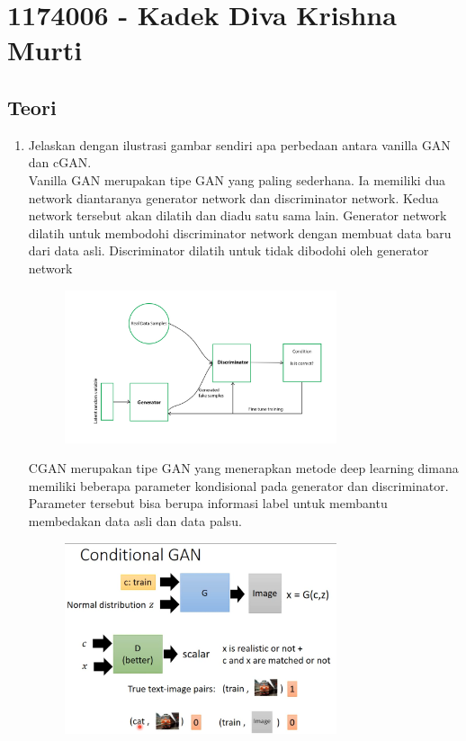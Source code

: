 \section{1174006 - Kadek Diva Krishna Murti}

\subsection{Teori}
\begin{enumerate}
	\item Jelaskan dengan ilustrasi gambar sendiri apa perbedaan antara vanilla GAN dan cGAN.\\
    Vanilla GAN merupakan tipe GAN yang paling sederhana. Ia memiliki dua network diantaranya generator network dan discriminator network. Kedua network tersebut akan dilatih dan diadu satu sama lain. Generator network dilatih untuk membodohi discriminator network dengan membuat data baru dari data asli. Discriminator dilatih untuk tidak dibodohi oleh generator network
    \begin{figure}[H]
		\includegraphics[width=8cm]{figures/1174006/chapter9/teori/vanilla.jpg}
		\centering
    \end{figure}
    CGAN merupakan tipe GAN yang menerapkan metode deep learning dimana memiliki beberapa parameter kondisional pada generator dan discriminator. Parameter tersebut bisa berupa informasi label untuk membantu membedakan data asli dan data palsu.
    \begin{figure}[H]
		\includegraphics[width=8cm]{figures/1174006/chapter9/teori/cgan.png}

\end{figure}
\end{enumerate}
